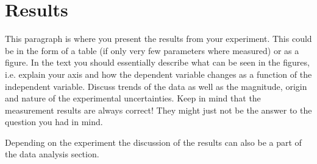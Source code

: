 \section{Results}

This paragraph is where you present the results from your
experiment. This could be in the form of a table (if only very few
parameters where measured) or as a figure. In the text you should
essentially describe what can be seen in the figures, i.e. explain
your axis and how the dependent variable changes as a function of
the independent variable. Discuss trends of the data as well as the
magnitude, origin and nature of the experimental uncertainties. Keep
in mind that the measurement results are always correct! They might
just not be the answer to the question you had in mind.

Depending on the experiment the discussion of the results can
also be a part of the data analysis section.